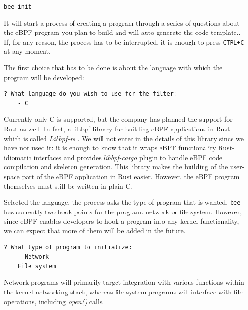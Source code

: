 \begin{lstlisting}[style=commandline, language=bash, caption={bee init command}]
	bee init
\end{lstlisting}

It will start a process of creating a program through a series of questions about the eBPF program you plan to build and will auto-generate the code template..
If, for any reason, the process has to be interrupted, it is enough to press \colorbox{backcolour}{\lstinline[style=highlight, language=bash]|CTRL+C|} at any moment.

The first choice that has to be done is about the language with which the program will be developed:

\begin{lstlisting}[style=commandline, language=bash, caption={bee language selection}]
	? What language do you wish to use for the filter: 
	- C
\end{lstlisting}

Currently only C is supported, but the company has planned the support for Rust as well.
In fact, a libbpf library for building eBPF applications in Rust which is called \textit{Libbpf-rs} \cite{libbpfRustGithubRepo}.
We will not enter in the details of this library since we have not used it: it is enough to know that it wraps eBPF functionality Rust-idiomatic interfaces and provides \textit{libbpf-cargo} plugin to handle eBPF code compilation and skeleton generation.
This library makes the building of the user-space part of the eBPF application in Rust easier.
However, the eBPF program themselves must still be written in plain C.

Selected the language, the process asks the type of program that is wanted.
\colorbox{backcolour}{\lstinline[style=highlight, language=bash]|bee|} has currently two hook points for the program: network or file system.
However, since eBPF enables developers to hook a program into any kernel functionality, we can expect that more of them will be added in the future.

\begin{lstlisting}[style=commandline, language=bash, caption={bee type of program selection}]
	? What type of program to initialize: 
	- Network
	File system
\end{lstlisting}

Network programs will primarily target integration with various functions within the kernel networking stack, whereas file-system programs will interface with file operations, including \textit{open()} calls.

